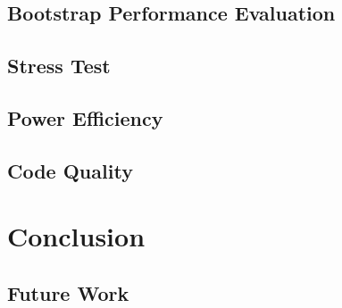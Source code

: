 \section{Bootstrap Performance Evaluation}

\section{Stress Test}

\section{Power Efficiency}

\section{Code Quality}



\chapter{Conclusion}

\section{Future Work}
